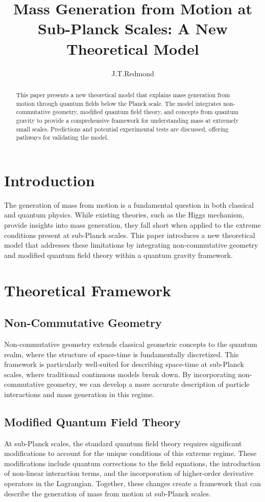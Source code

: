 \documentclass{article}
\title{Mass Generation from Motion at Sub-Planck Scales: A New Theoretical Model}
\author{J.T.Redmond}
\begin{document}
\maketitle

\begin{abstract}
This paper presents a new theoretical model that explains mass generation from motion through quantum fields below the Planck scale. The model integrates non-commutative geometry, modified quantum field theory, and concepts from quantum gravity to provide a comprehensive framework for understanding mass at extremely small scales. Predictions and potential experimental tests are discussed, offering pathways for validating the model.
\end{abstract}

\section{Introduction}
The generation of mass from motion is a fundamental question in both classical and quantum physics. While existing theories, such as the Higgs mechanism, provide insights into mass generation, they fall short when applied to the extreme conditions present at sub-Planck scales. This paper introduces a new theoretical model that addresses these limitations by integrating non-commutative geometry and modified quantum field theory within a quantum gravity framework.

\section{Theoretical Framework}

\subsection{Non-Commutative Geometry}
Non-commutative geometry extends classical geometric concepts to the quantum realm, where the structure of space-time is fundamentally discretized. This framework is particularly well-suited for describing space-time at sub-Planck scales, where traditional continuous models break down. By incorporating non-commutative geometry, we can develop a more accurate description of particle interactions and mass generation in this regime.

\subsection{Modified Quantum Field Theory}
At sub-Planck scales, the standard quantum field theory requires significant modifications to account for the unique conditions of this extreme regime. These modifications include quantum corrections to the field equations, the introduction of non-linear interaction terms, and the incorporation of higher-order derivative operators in the Lagrangian. Together, these changes create a framework that can describe the generation of mass from motion at sub-Planck scales.
\end{document}

